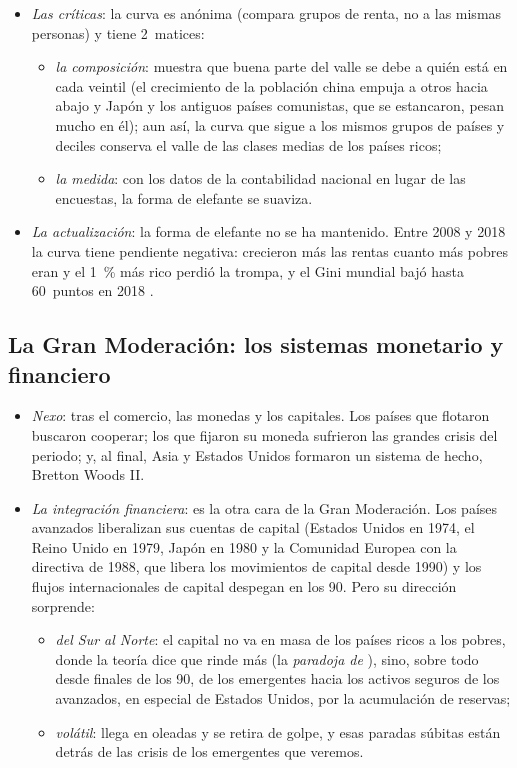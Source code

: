 \documentclass[11pt]{article}
\begin{document}
\begin{itemize}
\item \emph{Las críticas}: la curva es anónima (compara grupos de renta, no a las mismas personas) y tiene 2~matices:
  \begin{itemize}
  \item \emph{la composición}: \textcite{Corlett2016Elephant} muestra que buena parte del valle se debe a quién está en cada veintil (el crecimiento de la población china empuja a otros hacia abajo y Japón y los antiguos países comunistas, que se estancaron, pesan mucho en él); aun así, la curva que sigue a los mismos grupos de países y deciles conserva el valle de las clases medias de los países ricos;
  \item \emph{la medida}: con los datos de la contabilidad nacional en lugar de las encuestas, la forma de elefante se suaviza\nocite{KharasSeidel2018}.
  \end{itemize}
\item \emph{La actualización}: la forma de elefante no se ha mantenido. Entre 2008 y 2018 la curva tiene pendiente negativa: crecieron más las rentas cuanto más pobres eran y el 1~\% más rico perdió la trompa, y el Gini mundial bajó hasta 60~puntos en 2018\nocite{Milanovic2024ThreeEras} .
\end{itemize}

\subsection{La Gran Moderación: los sistemas monetario y financiero}\label{sec:monetario-moderacion}

\begin{itemize}
\item \emph{Nexo}: tras el comercio, las monedas y los capitales. Los países que flotaron buscaron cooperar; los que fijaron su moneda sufrieron las grandes crisis del periodo; y, al final, Asia y Estados Unidos formaron un sistema de hecho, Bretton Woods II.
\item \emph{La integración financiera}: es la otra cara de la Gran Moderación. Los países avanzados liberalizan sus cuentas de capital (Estados Unidos en 1974, el Reino Unido en 1979, Japón en 1980 y la Comunidad Europea con la directiva de 1988, que libera los movimientos de capital desde 1990) y los flujos internacionales de capital despegan en los 90. Pero su dirección sorprende:
  \begin{itemize}
  \item \emph{del Sur al Norte}: el capital no va en masa de los países ricos a los pobres, donde la teoría dice que rinde más (la \emph{paradoja de }), sino, sobre todo desde finales de los 90, de los emergentes hacia los activos seguros de los avanzados, en especial de Estados Unidos, por la acumulación de reservas\nocite{Lucas1990Why};
  \item \emph{volátil}: llega en oleadas y se retira de golpe, y esas paradas súbitas están detrás de las crisis de los emergentes que veremos.
  \end{itemize}
\end{itemize}
\end{document}
